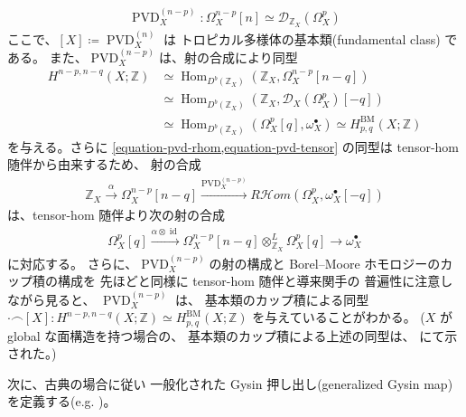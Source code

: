 \documentclass[a4paper,dvipdfmx,reqno,12pt]{amsart}
\theoremstyle{definition}
\newcommand{\deq}{\coloneqq}
\newcommand{\opn}[1]{\operatorname{#1}}
\newcommand{\xto}[1]{\xrightarrow{#1}}
\numberwithin{equation}{section}
\begin{document}
\begin{align}
\opn{PVD}^{(n-p)}_X\colon \Omega_{X}^{n-p}[n]\simeq
\mathcal{D}_{\mathbb{Z}_X}(\Omega_X^{p})
\end{align}
ここで、$[X]\deq \opn{PVD}^{(n)}_X$ は
トロピカル多様体の基本類(fundamental class)
である。
また、$\opn{PVD}^{(n-p)}_X$は、射の合成により同型
\begin{align}
H^{n-p,n-q}(X;\mathbb{Z})& \simeq
\opn{Hom}_{D^{b}(\mathbb{Z}_X)}
(\mathbb{Z}_X,\Omega_X^{n-p}[n-q]) \\
& \simeq \opn{Hom}_{D^{b}(\mathbb{Z}_X)}
(\mathbb{Z}_X,\mathcal{D}_X(\Omega_X^{p})[-q])
\label{equation-pvd-rhom} \\
& \simeq \opn{Hom}_{D^{b}(\mathbb{Z}_X)}
(\Omega_X^{p}[q],\omega_X^{\bullet})
\simeq H_{p,q}^{\mathrm{BM}}(X;\mathbb{Z})
\label{equation-pvd-tensor}
\end{align}
を与える。さらに
\cref{equation-pvd-rhom,equation-pvd-tensor}
の同型は tensor-hom 随伴から由来するため、
射の合成
\begin{align}
\mathbb{Z}_X \xto{\alpha} \Omega_X^{n-p}[n-q] 
\xto{\opn{PVD}^{(n-p)}_X} 
R\mathcal{H}om (\Omega_X^{p},\omega_X^{\bullet}[-q])
\end{align}
は、tensor-hom 随伴より次の射の合成
\begin{align}
\Omega_X^{p}[q]\xto{\alpha \otimes \opn{id}} \Omega_X^{n-p}[n-q]\otimes^{L}_{\mathbb{Z}_X}
\Omega_X^{p}[q] \to\omega_X^{\bullet}
\end{align}
に対応する。
さらに、$\opn{PVD}^{(n-p)}_X$の射の構成と
Borel--Moore ホモロジーのカップ積の構成を
先ほどと同様に tensor-hom 随伴と導来関手の
普遍性に注意しながら見ると、
$\opn{PVD}^{(n-p)}_X$ は、
基本類のカップ積による同型
$\cdot \frown [X]
\colon H^{n-p,n-q}(X;\mathbb{Z})\simeq
H^{\mathrm{BM}}_{p,q}(X;\mathbb{Z})$
を与えていることがわかる。
($X$ が global な面構造を持つ場合の、
基本類のカップ積による上述の同型は、
\cite[Theorem 5.3]{MR3894860} にて示された。)

次に、古典の場合に従い
一般化された Gysin 押し出し(generalized Gysin map)
を定義する(e.g. 
\cite[Chapter 13]{MR2810322})。
\end{document}
